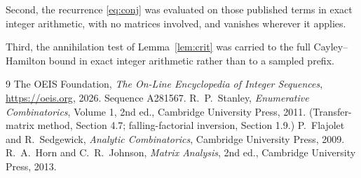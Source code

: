 \documentclass[11pt,a4paper]{article}
\theoremstyle{plain}
\theoremstyle{definition}
\begin{document}
Second, the recurrence \eqref{eq:conj} was evaluated on those published terms in exact
integer arithmetic, with no matrices involved, and vanishes wherever it applies.

Third, the annihilation test of Lemma~\ref{lem:crit} was carried to the full
Cayley--Hamilton bound in exact integer arithmetic rather than to a sampled prefix.

\begin{thebibliography}{9}
 The OEIS Foundation, \emph{The On-Line Encyclopedia of Integer
Sequences}, \url{https://oeis.org}, 2026. Sequence A281567.
 R.~P.~Stanley, \emph{Enumerative Combinatorics}, Volume 1, 2nd ed.,
Cambridge University Press, 2011. (Transfer-matrix method, Section 4.7; falling-factorial
inversion, Section 1.9.)
 P.~Flajolet and R.~Sedgewick, \emph{Analytic Combinatorics}, Cambridge
University Press, 2009.
 R.~A.~Horn and C.~R.~Johnson, \emph{Matrix Analysis}, 2nd ed., Cambridge
University Press, 2013.
\end{thebibliography}
\end{document}

